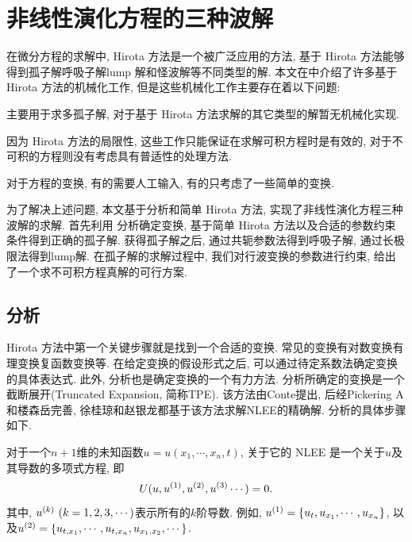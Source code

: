 \chapter{非线性演化方程的三种波解}\label{ch02}
在微分方程的求解中, Hirota 方法是一个被广泛应用的方法, 基于 Hirota 方法能够得到孤子解\D 呼吸子解\D lump 解和怪波解等不同类型的解. 本文在中介绍了许多基于 Hirota 方法的机械化工作, 但是这些机械化工作主要存在着以下问题:
\begin{inparaenum}[(1)]
\item 主要用于求多孤子解, 对于基于 Hirota 方法求解的其它类型的解暂无机械化实现.
\item 因为 Hirota 方法的局限性, 这些工作只能保证在求解可积方程时是有效的, 对于不可积的方程则没有考虑具有普适性的处理方法. 
\item 对于方程的变换, 有的需要人工输入, 有的只考虑了一些简单的变换. 
\end{inparaenum}

为了解决上述问题, 本文基于\Painleve{}分析和简单 Hirota 方法, 实现了非线性演化方程三种波解的求解. 首先利用 \Painleve{} 分析确定变换, 基于简单 Hirota 方法以及合适的参数约束条件得到正确的孤子解. 获得孤子解之后, 通过共轭参数法得到呼吸子解, 通过长极限法得到lump解. 在孤子解的求解过程中, 我们对行波变换的参数进行约束, 给出了一个求不可积方程真解的可行方案. 

\section{\Painleve{} 分析}

Hirota 方法中第一个关键步骤就是找到一个合适的变换. 常见的变换有对数变换\D 有理变换\D 复函数变换等. 在给定变换的假设形式之后, 可以通过待定系数法确定变换的具体表达式.  此外, \Painleve{}分析也是确定变换的一个有力方法. \Painleve{}分析所确定的变换是一个\Painleve{}截断展开(Truncated \Painleve{} Expansion, 简称TPE). 该方法由Conte\cite{conte1989invariant}提出, 后经Pickering A\cite{pickering1993new}和楼森岳\cite{lou1998extended}完善, 徐桂琼\cite{xuPHD}和赵银龙\cite{zhaoMST}都基于该方法求解NLEE的精确解. \Painleve{}分析的具体步骤如下. 

对于一个$n+1$维的未知函数$u=u(x_1,\cdots,x_n,t)$, 关于它的 NLEE 是一个关于$u$及其导数的多项式方程, 即
\begin{equation}
    U(u,u^{(1)},u^{(2)},u^{(3)}\cdots)=0. \label{oeq}
\end{equation}
其中, $u^{(k)}~(k=1,2,3,\cdots)$表示所有的$k$阶导数. 例如, $u^{(1)}=\left\{u_t,u_{x_1},\cdots,u_{x_n}\right\}$, 以及$u^{(2)}=\left\{u_{t,x_1},\cdots,u_{t,x_n},u_{x_1,x_2},\cdots\right\}$.

